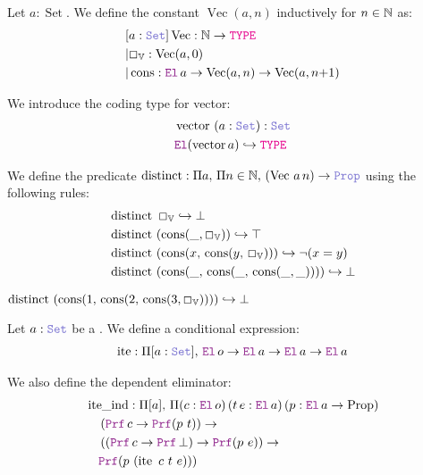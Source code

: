 \begin{definition}
Let \( a : \mathop{\mathrm{Set}} \). We define the constant \( \mathop{\mathrm{Vec}}(a, n) \) inductively for \( n \in \mathbb{N} \) as:
\begin{align*}
&[a: \set] \mathop{\mathrm{Vec}}: \N \ra \type \\
&|\Box_\bb{V} : \mathop{\mathrm{Vec}}(a, 0) \\
&|\mathop{\mathrm{cons}}: \el\,a \ra \mathop{\mathrm{Vec}}(a, n) \ra  \mathop{\mathrm{Vec}}(a, n{+}1) \\
\end{align*}

We introduce the coding type for vector:
\begin{align*}
&\mathop{\mathrm{vector}}~(a: \set): \set \\
&\el (\mathop{\mathrm{vector}} a) \re \type
\end{align*}

We define the predicate \( \mathop{\mathrm{distinct}}: \Pi a,\, \Pi n \in \N,\, (\mathop{\mathrm{Vec}}\,a\,n) \ra \prop \) using the following rules:
\begin{align*}
&\mathop{\mathrm{distinct}}~\Box_\mathbb{V} \hookrightarrow \bot \\
&\mathop{\mathrm{distinct}}~(\mathop{\mathrm{cons}}(\_, \Box_\mathbb{V})) \hookrightarrow \top \\
&\mathop{\mathrm{distinct}}~(\mathop{\mathrm{cons}}(x,\, \mathop{\mathrm{cons}}(y,\, \Box_\mathbb{V}))) \hookrightarrow \neg (x = y) \\
&\mathop{\mathrm{distinct}}~(\mathop{\mathrm{cons}}(\_,\, \mathop{\mathrm{cons}}(\_,\, \mathop{\mathrm{cons}}(\_,\_)))) \hookrightarrow \bot
\end{align*}
\end{definition}

\begin{example}
\(
    \mathop{\mathrm{distinct}}~(\mathop{\mathrm{cons}}(1,\, \mathop{\mathrm{cons}}(2,\, \mathop{\mathrm{cons}}(3, \Box_\mathbb{V})))) \hookrightarrow \bot
\)
\end{example}

\begin{definition}
Let \( a: \set \) be a \set. We define a conditional expression:
\begin{align*}
\mathop{\mathrm{ite}} : \Pi [a: \set],\, \el\,o \ra \el\,a \ra \el\,a \ra \el\,a
\end{align*}

We also define the dependent eliminator:
\begin{align*}
&\mathop{\mathrm{ite\_ind}} : \Pi [a],\, \Pi (c : \el\,o)\, (t\, e : \el\,a)\, (p : \el\,a \ra \mathrm{Prop})\\
&\quad\left( \prf\,c \ra \prf(p~t) \right) \ra \\
&\quad\left( (\prf\,c \ra \prf\,\bot) \ra \prf(p~e) \right) \ra \\
&\quad\prf(p~(\mathop{\mathrm{ite}}~c~t~e)))
\end{align*}
\end{definition}
